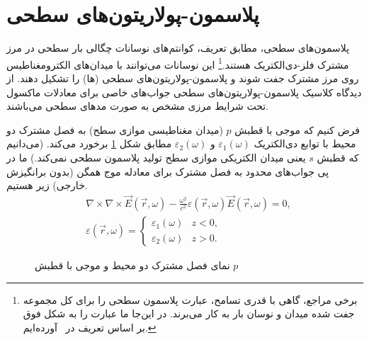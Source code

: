 \section{پلاسمون-پولاریتون‌های سطحی}
پلاسمون‌های سطحی، مطابق تعریف، كوانتم‌های نوسانات چگالی بار سطحی در مرز مشترک فلز-دی‌الکتریک هستند.\footnote{ برخی مراجع، گاهی با قدری تسامح، عبارت پلاسمون سطحی را برای کل مجموعه جفت شده میدان و نوسان بار به کار می‌برند. در این‌جا ما عبارت را به شکل فوق بر اساس تعریف  در~\cite{navotny2012} آورده‌ایم.} این نوسانات می‌توانند با میدان‌های الکترومغناطیس روی مرز مشترک جفت شوند و پلاسمون-پولاریتون‌های سطحی  (ها) را تشکیل دهند. از دیدگاه کلاسیک پلاسمون-پولاریتون‌های سطحی جواب‌های خاصی برای معادلات ماکسول تحت شرایط مرزی مشخص به صورت مدهای سطحی می‌باشند.

فرض کنیم که موجی با قطبش $p$ (میدان مغناطیسی موازی سطح) به فصل مشترک دو محیط با توابع دی‌الکتریک $\varepsilon_1(\omega)$ و $\varepsilon_2(\omega)$ مطابق شکل \ref{fig:1} برخورد می‌کند. (می‌دانیم که قطبش $s$ یعنی میدان الکتریکی موازی سطح تولید پلاسمون سطحی نمی‌کند.) ما در پی جواب‌های محدود به فصل مشترک برای معادله موج همگن (بدون برانگیزش خارجی) زیر هستیم.
\begin{align}
&\nabla\times\nabla\times\vec{E}(\vec{r},\omega)-\frac{\omega ^2}{c^2}\varepsilon(\vec{r},\omega)\vec{E}(\vec{r},\omega)=0,\label{eq:2}\\
&\varepsilon(\vec{r},\omega)=\begin{cases}\varepsilon_1(\omega)& z<0,\\
\varepsilon_2(\omega)& z>0.\end{cases}\label{eq:3}
\end{align}
\begin{figure}[tb]
	\caption{نمای فصل مشترک دو محیط و موجی با قطبش $p$}\label{fig:1}
\end{figure}

